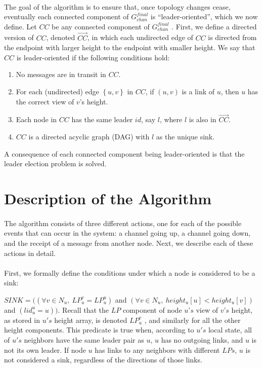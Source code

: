 \paragraph{}The goal of the algorithm is to ensure that, once topology changes cease, eventually each connected component of $G_{chan} ^{final}$ is “leader-oriented”, which we now define. Let $CC$ be any connected component of $G_{chan} ^{final}$ . First, we define a directed version of $CC$, denoted $\overset{\longrightarrow}{CC}$, in which each undirected edge of $CC$ is directed from the endpoint with larger height to the endpoint with smaller height. We say that $CC$ is leader-oriented if the following conditions hold:
\begin{enumerate}
	\item No messages are in transit in $CC$.
	\item For each (undirected) edge $\left\lbrace  u, v \right\rbrace $ in $CC$, if $(u, v)$ is a link of $u$, then $u$ has the correct view of $v$’s height.
	\item  Each node in $CC$ has the same leader $id$, say $l$, where $l$ is also in $\overset{\longrightarrow}{CC}$. 
	\item  $CC$ is a directed acyclic graph (DAG) with $l$ as the unique sink.
\end{enumerate}
A consequence of each connected component being leader-oriented is that the leader election problem is solved.
\section{Description of the Algorithm}
\paragraph{}The algorithm consists of three different actions, one for each of the possible events that can occur in the system: a channel going up, a channel going down, and the receipt of a message from another node. Next, we describe each of these actions in detail.
\paragraph{}First, we formally define the conditions under which a node is considered to be a sink:
\begin{list}{--}{}
	\item $SINK = ((\forall v \in N_u,~LP_u ^v = LP_u ^u )$ and $(\forall v \in N_u,~height_u[u] < height_u[v])$ and $(lid_u ^u = u))$. Recall that the $LP$ component of node $u’s$ view of $v’s$ height, as stored in $u's$ height array, is denoted $LP_u ^v$ , and similarly for all the other height components. This predicate is true when, according to $u's$ local state, all of $u's$ neighbors have the same leader pair as $u$, $u$ has no outgoing links, and $u$ is not its own leader. If node $u$ has links to any neighbors with different $LPs$, $u$ is not considered a sink, regardless of the directions of those links.
\end{list}
